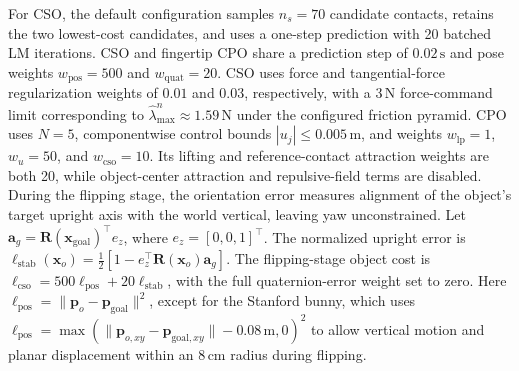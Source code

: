 For CSO, the default configuration samples $n_s=70$ candidate contacts, retains the two lowest-cost candidates, and uses a one-step prediction with 20 batched LM iterations. CSO and fingertip CPO share a prediction step of $0.02\,\mathrm{s}$ and pose weights $w_{\mathrm{pos}}=500$ and $w_{\mathrm{quat}}=20$. CSO uses force and tangential-force regularization weights of $0.01$ and $0.03$, respectively, with a $3\,\mathrm{N}$ force-command limit corresponding to $\hat{\lambda}^{n}_{\max}\approx1.59\,\mathrm{N}$ under the configured friction pyramid. CPO uses $N=5$, componentwise control bounds $|u_j|\leq0.005\,\mathrm{m}$, and weights $w_{\mathrm{lp}}=1$, $w_u=50$, and $w_{\mathrm{cso}}=10$. Its lifting and reference-contact attraction weights are both 20, while object-center attraction and repulsive-field terms are disabled. During the flipping stage, the orientation error measures alignment of the object's target upright axis with the world vertical, leaving yaw unconstrained. Let $\boldsymbol{a}_g=\boldsymbol{R}(\boldsymbol{x}_{\mathrm{goal}})^\top e_z$, where $e_z=[0,0,1]^\top$. The normalized upright error is $\ell_{\mathrm{stab}}(\boldsymbol{x}_o) = \frac{1}{2}\left[1-e_z^\top\boldsymbol{R}(\boldsymbol{x}_o)\boldsymbol{a}_g\right]$. The flipping-stage object cost is $\ell_{\mathrm{cso}}=500\ell_{\mathrm{pos}}+20\ell_{\mathrm{stab}}$, with the full quaternion-error weight set to zero. Here $\ell_{\mathrm{pos}}=\|\boldsymbol{p}_o-\boldsymbol{p}_{\mathrm{goal}}\|^2$, except for the Stanford bunny, which uses $\ell_{\mathrm{pos}}=\max(\|\boldsymbol{p}_{o,xy}-\boldsymbol{p}_{\mathrm{goal},xy}\|-0.08\,\mathrm{m},0)^2$ to allow vertical motion and planar displacement within an $8\,\mathrm{cm}$ radius during flipping.

